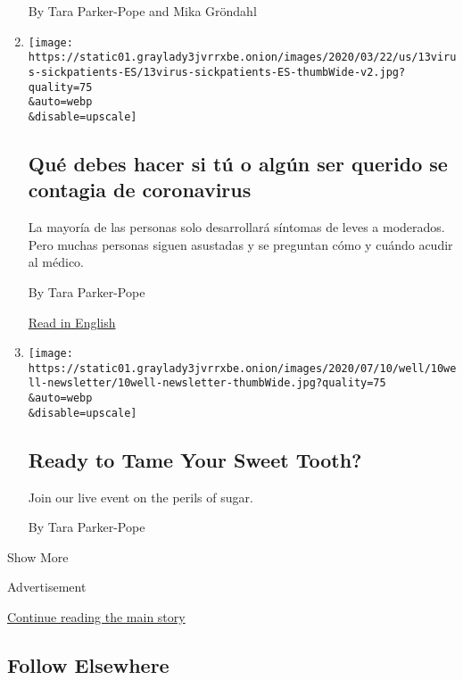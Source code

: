 \begin{enumerate}
  By Tara Parker-Pope and Mika Gröndahl
\item
  \href{/es/2020/07/13/espanol/ciencia-y-tecnologia/tengo-covid-que-hago.html}{}

  \texttt{[image: https://static01.graylady3jvrrxbe.onion/images/2020/03/22/us/13virus-sickpatients-ES/13virus-sickpatients-ES-thumbWide-v2.jpg?quality=75\\\&auto=webp\\\&disable=upscale]}

  \hypertarget{quuxe9-debes-hacer-si-tuxfa-o-alguxfan-ser-querido-se-contagia-de-coronavirus}{%
  \subsection{Qué debes hacer si tú o algún ser querido se contagia de
  coronavirus}\label{quuxe9-debes-hacer-si-tuxfa-o-alguxfan-ser-querido-se-contagia-de-coronavirus}}

  La mayoría de las personas solo desarrollará síntomas de leves a
  moderados. Pero muchas personas siguen asustadas y se preguntan cómo y
  cuándo acudir al médico.

  By Tara Parker-Pope

  \href{https://www.nytimes3xbfgragh.onion/2020/03/22/well/what-if-i-have-coronavirus.html}{Read
  in English}
\item
  \href{/2020/07/09/well/eat/ready-to-tame-your-sweet-tooth.html}{}

  \texttt{[image: https://static01.graylady3jvrrxbe.onion/images/2020/07/10/well/10well-newsletter/10well-newsletter-thumbWide.jpg?quality=75\\\&auto=webp\\\&disable=upscale]}

  \hypertarget{ready-to-tame-your-sweet-tooth}{%
  \subsection{Ready to Tame Your Sweet
  Tooth?}\label{ready-to-tame-your-sweet-tooth}}

  Join our live event on the perils of sugar.

  By Tara Parker-Pope
\end{enumerate}

Show More

Advertisement

\protect\hyperlink{after-mid2}{Continue reading the main story}

\hypertarget{follow-elsewhere}{%
\subsection{Follow Elsewhere}\label{follow-elsewhere}}

